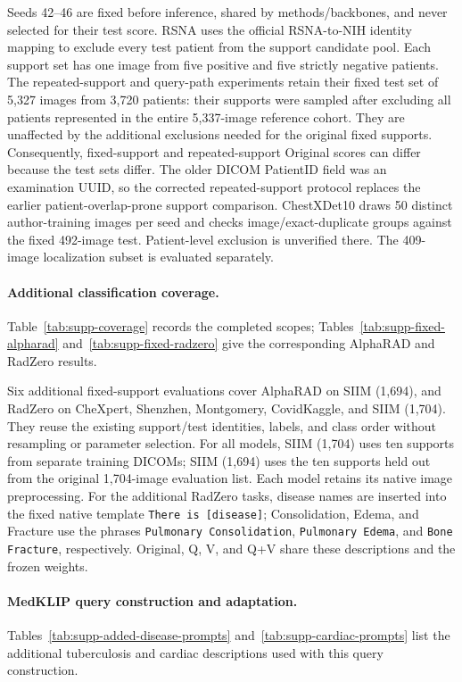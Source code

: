 Seeds 42--46 are fixed before inference, shared by methods/backbones, and never selected for their test score. RSNA uses the official RSNA-to-NIH identity mapping to exclude every test patient from the support candidate pool. Each support set has one image from five positive and five strictly negative patients. The repeated-support and query-path experiments retain their fixed test set of 5,327 images from 3,720 patients: their supports were sampled after excluding all patients represented in the entire 5,337-image reference cohort. They are unaffected by the additional exclusions needed for the original fixed supports. Consequently, fixed-support and repeated-support Original scores can differ because the test sets differ. The older DICOM PatientID field was an examination UUID, so the corrected repeated-support protocol replaces the earlier patient-overlap-prone support comparison. ChestXDet10 draws 50 distinct author-training images per seed and checks image/exact-duplicate groups against the fixed 492-image test. Patient-level exclusion is unverified there. The 409-image localization subset is evaluated separately.

\paragraph{Additional classification coverage.}
Table~\ref{tab:supp-coverage} records the completed scopes; Tables~\ref{tab:supp-fixed-alpharad} and~\ref{tab:supp-fixed-radzero} give the corresponding AlphaRAD and RadZero results.

Six additional fixed-support evaluations cover AlphaRAD on SIIM (1,694), and RadZero on CheXpert, Shenzhen, Montgomery, CovidKaggle, and SIIM (1,704). They reuse the existing support/test identities, labels, and class order without resampling or parameter selection. For all models, SIIM (1,704) uses ten supports from separate training DICOMs; SIIM (1,694) uses the ten supports held out from the original 1,704-image evaluation list. Each model retains its native image preprocessing. For the additional RadZero tasks, disease names are inserted into the fixed native template \texttt{There is [disease]}; Consolidation, Edema, and Fracture use the phrases \texttt{Pulmonary Consolidation}, \texttt{Pulmonary Edema}, and \texttt{Bone Fracture}, respectively. Original, Q, V, and Q+V share these descriptions and the frozen weights.



\paragraph{MedKLIP query construction and adaptation.}
Tables~\ref{tab:supp-added-disease-prompts} and~\ref{tab:supp-cardiac-prompts} list the additional tuberculosis and cardiac descriptions used with this query construction.

